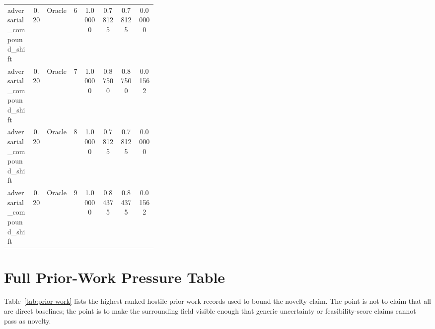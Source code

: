 \documentclass{article}
\begin{document}
\begin{center}
\begin{longtable}{p{0.17\linewidth}cp{0.18\linewidth}ccccc}
adversarial\_compound\_shift & 0.20 & Oracle & 6 & 1.00000 & 0.78125 & 0.78125 & 0.00000\\
adversarial\_compound\_shift & 0.20 & Oracle & 7 & 1.00000 & 0.87500 & 0.87500 & 0.01562\\
adversarial\_compound\_shift & 0.20 & Oracle & 8 & 1.00000 & 0.78125 & 0.78125 & 0.00000\\
adversarial\_compound\_shift & 0.20 & Oracle & 9 & 1.00000 & 0.84375 & 0.84375 & 0.01562\\
\bottomrule
\end{longtable}
\normalsize
\end{center}

\section{Full Prior-Work Pressure Table}

Table~\ref{tab:prior-work} lists the highest-ranked hostile prior-work records used to bound the novelty claim. The point is not to claim that all are direct baselines; the point is to make the surrounding field visible enough that generic uncertainty or feasibility-score claims cannot pass as novelty.
\end{document}
